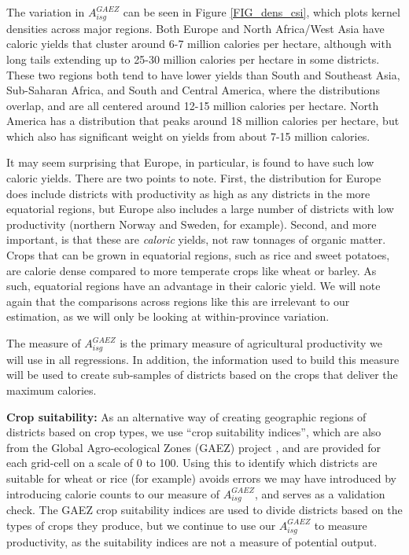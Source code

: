 \documentclass[11pt]{article}
\begin{document}
The variation in $A^{GAEZ}_{isg}$ can be seen in Figure \ref{FIG_dens_csi}, which plots kernel densities across major regions. Both Europe and North Africa/West Asia have caloric yields that cluster around 6-7 million calories per hectare, although with long tails extending up to 25-30 million calories per hectare in some districts. These two regions both tend to have lower yields than South and Southeast Asia, Sub-Saharan Africa, and South and Central America, where the distributions overlap, and are all centered around 12-15 million calories per hectare. North America has a distribution that peaks around 18 million calories per hectare, but which also has significant weight on yields from about 7-15 million calories. 

It may seem surprising that Europe, in particular, is found to have such low caloric yields. There are two points to note. First, the distribution for Europe does include districts with productivity as high as any districts in the more equatorial regions, but Europe also includes a large number of districts with low productivity (northern Norway and Sweden, for example). Second, and more important, is that these are \textit{caloric} yields, not raw tonnages of organic matter. Crops that can be grown in equatorial regions, such as rice and sweet potatoes, are calorie dense compared to more temperate crops like wheat or barley. As such, equatorial regions have an advantage in their caloric yield. We will note again that the comparisons across regions like this are irrelevant to our estimation, as we will only be looking at within-province variation.

The measure of $A^{GAEZ}_{isg}$ is the primary measure of agricultural productivity we will use in all regressions. In addition, the information used to build this measure will be used to create sub-samples of districts based on the crops that deliver the maximum calories.

\vspace{.5cm}\noindent\textbf{Crop suitability:} As an alternative way of creating geographic regions of districts based on crop types, we use ``crop suitability indices'', which are also from the Global Agro-ecological Zones (GAEZ) project \citep{gaez}, and are provided for each grid-cell on a scale of 0 to 100. Using this to identify which districts are suitable for wheat or rice (for example) avoids errors we may have introduced by introducing calorie counts to our measure of $A^{GAEZ}_{isg}$, and serves as a validation check. The GAEZ crop suitability indices are used to divide districts based on the types of crops they produce, but we continue to use our $A^{GAEZ}_{isg}$ to measure productivity, as the suitability indices are not a measure of potential output.
\end{document}
